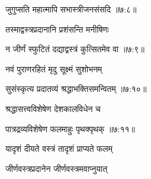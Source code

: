 
{\devanagarifont जुगुप्सति महात्मापि सभास्त्रीजनसंसदि {॥७:८॥} \veg\dontdisplaylinenum }%
 
{\devanagarifont तस्माद्वस्त्रप्रदानानि प्रशंसन्ति मनीषिणः \thinspace{\dandab} \dontdisplaylinenum }%
 

{\devanagarifont न जीर्णं स्फुटितं दद्याद्वस्त्रं कुत्सितमेव वा {॥७:९॥} \veg\dontdisplaylinenum }%

{\devanagarifont नवं पुराणरहितं मृदु सूक्ष्मं सुशोभनम् \thinspace{\dandab} \dontdisplaylinenum }%


{\devanagarifont सुसंस्कृत्य प्रदातव्यं श्रद्धाभक्तिसमन्वितम् {॥७:१०॥} \veg\dontdisplaylinenum }%

{\devanagarifont श्रद्धासत्त्वविशेषेण देशकालविधेन च \thinspace{\dandab} \dontdisplaylinenum }%


{\devanagarifont पात्रद्रव्यविशेषेण फलमाहुः पृथक्पृथक् {॥७:११॥} \veg\dontdisplaylinenum }%

{\devanagarifont यादृशं दीयते वस्त्रं तादृशं प्राप्यते फलम् \thinspace{\dandab} \dontdisplaylinenum }%
 
{\devanagarifont जीर्णवस्त्रप्रदानेन जीर्णवस्त्रमवाप्नुयात्  \danda\dontdisplaylinenum }%
 
